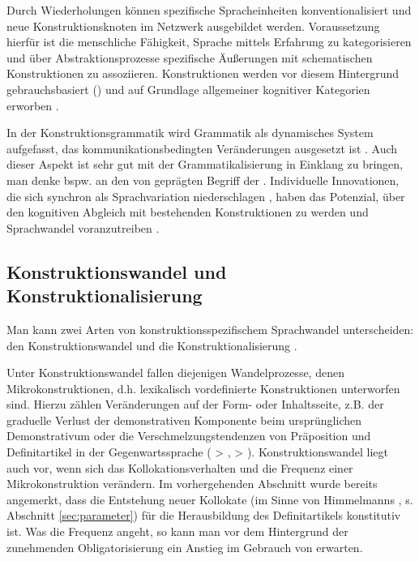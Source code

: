Durch Wiederholungen können spezifische Spracheinheiten konventionalisiert und neue Konstruktionsknoten im Netzwerk ausgebildet werden. Voraussetzung hierfür ist die menschliche Fähigkeit, Sprache mittels Erfahrung zu kategorisieren und über Abstraktionsprozesse spezifische Äußerungen mit schematischen Konstruktionen zu assoziieren. Konstruktionen werden vor diesem Hintergrund gebrauchsbasiert () und auf Grundlage allgemeiner kognitiver Kategorien erworben \parencite[u.a.][]{Langacker1987,Goldberg2006,Bybee2006,Bybee2010,Bybee2013}.

In der Konstruktionsgrammatik wird Grammatik als dynamisches System aufgefasst, das kommunikationsbedingten Veränderungen ausgesetzt ist \parencite[35--36]{Imo2007}. Auch dieser Aspekt ist sehr gut mit der Grammatikalisierung in Einklang zu bringen, man denke bspw. an den von  \textcite{Hopper1991} geprägten Begriff der . Individuelle Innovationen, die sich synchron als Sprachvariation niederschlagen \parencite{Croft2010}, haben das Potenzial, über den kognitiven Abgleich mit bestehenden Konstruktionen  zu werden und Sprachwandel voranzutreiben \parencite[66]{Langacker1987}. 

\subsection{Konstruktionswandel und Konstruktionalisierung}\label{sec:konstruktionalisierung}

Man kann zwei Arten von konstruktionsspezifischem Sprachwandel unterscheiden: den Konstruktionswandel und die Konstruktionalisierung \parencite[vgl.][]{Hilpert2011,Hilpert2013,Fried2013,Traugott2013,Traugott2015,Trousdale2014}. 

Unter Konstruktionswandel fallen diejenigen Wandelprozesse, denen Mikrokonstruktionen, d.h. lexikalisch vordefinierte Konstruktionen unterworfen sind. Hierzu zählen Veränderungen auf der Form- oder Inhaltsseite, z.B. der graduelle Verlust der demonstrativen Komponente beim ursprünglichen Demonstrativum  oder die Verschmelzungstendenzen von Präposition und Definitartikel in der Gegenwartssprache ( > ,  > ). Konstruktionswandel liegt auch vor, wenn sich das Kollokationsverhalten und die Frequenz einer Mikrokonstruktion verändern. Im vorhergehenden Abschnitt wurde bereits angemerkt, dass die Entstehung neuer Kollokate (im Sinne von Himmelmanns  , s. Abschnitt \ref{sec:parameter}) für die Herausbildung des Definitartikels konstitutiv ist. Was die Frequenz angeht, so kann man vor dem Hintergrund der zunehmenden Obligatorisierung ein Anstieg im Gebrauch von  erwarten. 

